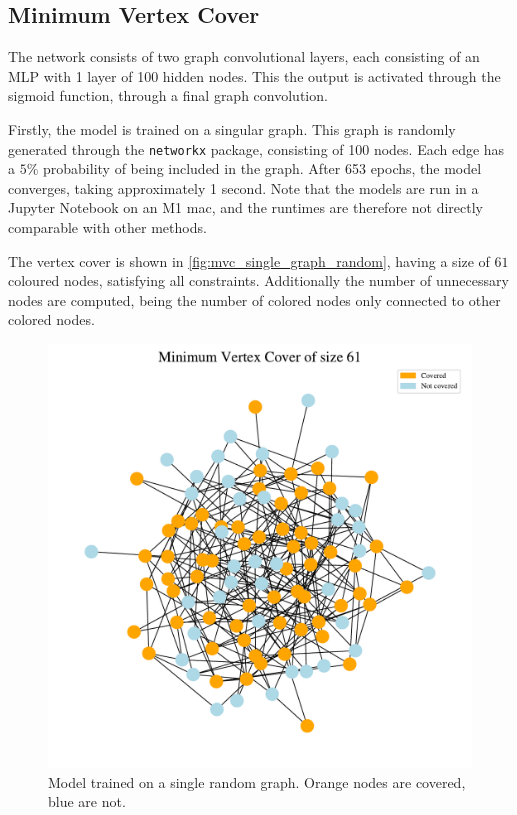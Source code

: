 \subsection{Minimum Vertex Cover}
The network consists of two graph convolutional layers, each consisting of an MLP with 1 layer of 100 hidden nodes.
This the output is activated through the sigmoid function, through a final graph convolution.

Firstly, the model is trained on a singular graph.
This graph is randomly generated through the \verb|networkx| package, consisting of 100 nodes.
Each edge has a $5\%$ probability of being included in the graph.
After 653 epochs, the model converges, taking approximately 1 second.
Note that the models are run in a Jupyter Notebook on an M1 mac, and the runtimes are therefore not directly comparable with other methods.

The vertex cover is shown in \autoref{fig:mvc_single_graph_random}, having a size of $61$ coloured nodes, satisfying all constraints.
Additionally the number of unnecessary nodes are computed, being the number of colored nodes only connected to other colored nodes.

\begin{figure}[h]
    \centering
    \includegraphics[width=\linewidth]{Project2TSP/_src/figures/mvc_graph_single.pdf}
    \caption{Model trained on a single random graph. Orange nodes are covered, blue are not.}
    \label{fig:mvc_single_graph_random}
\end{figure}

